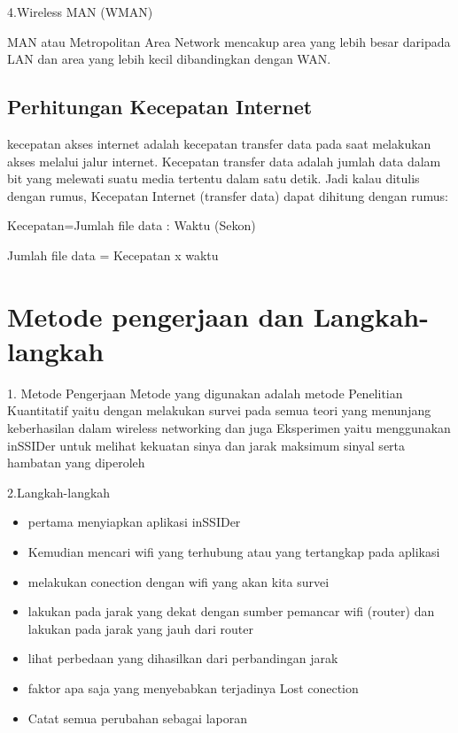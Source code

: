 \documentclass[conference]{IEEEtran}
\begin{document}
4.Wireless MAN (WMAN)
\vspace{1pt}

MAN atau Metropolitan Area Network mencakup area yang lebih besar daripada LAN dan area yang lebih kecil dibandingkan dengan WAN.
 
\subsection{Perhitungan Kecepatan Internet}
kecepatan akses internet adalah kecepatan transfer data pada saat melakukan akses melalui jalur internet. Kecepatan transfer data adalah jumlah data dalam bit yang melewati suatu media tertentu dalam satu detik.
Jadi kalau ditulis dengan rumus, Kecepatan Internet (transfer data) dapat dihitung dengan rumus:
\vspace{2pt}

Kecepatan=Jumlah file data : Waktu (Sekon)

Jumlah file data = Kecepatan x waktu

\section{Metode pengerjaan dan Langkah-langkah}
1. Metode Pengerjaan
Metode yang digunakan adalah metode Penelitian Kuantitatif yaitu dengan melakukan survei pada semua teori yang menunjang keberhasilan dalam wireless networking dan juga Eksperimen yaitu menggunakan inSSIDer untuk melihat kekuatan sinya dan jarak maksimum sinyal serta hambatan yang diperoleh
\vspace{4pt}

2.Langkah-langkah 
\begin{itemize}
    \item pertama menyiapkan aplikasi inSSIDer
    \item Kemudian mencari wifi yang terhubung atau yang tertangkap pada aplikasi
    \item melakukan conection dengan wifi yang akan kita survei
    \item lakukan pada jarak yang dekat dengan sumber pemancar wifi (router) dan lakukan pada jarak yang jauh dari router
    \item lihat perbedaan yang dihasilkan dari perbandingan jarak
    \item faktor apa saja yang menyebabkan terjadinya Lost conection
    \item Catat semua perubahan sebagai laporan
\end{itemize}
\vspace{4cm}
\end{document}
